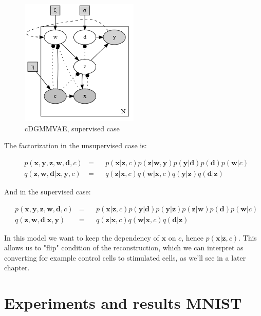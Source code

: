 \documentclass[11pt, a4paper]{report}
\theoremstyle{plain}
\theoremstyle{definition}
\theoremstyle{remark}
\newcommand{\x}{\mathbf{x}}
\newcommand{\z}{\mathbf{z}}
\newcommand{\y}{\mathbf{y}}
\newcommand{\w}{\mathbf{w}}
\newcommand{\dd}{\mathbf{d}}
\begin{document}
\begin{figure}[!hb]
\begin{framed}
\centering
\includegraphics[width=0.5\textwidth]{plots/dirichlet_gmm_cvae_supervised.gv.png}
\caption{cDGMMVAE, supervised case}
\label{fig:dirgmmcvae_super}
\end{framed}
\end{figure}

The factorization in the unsupervised case is:

\begin{equation}
\begin{aligned}
&p(\x, \y, \z, \w, \dd, c) &=& 
&p(\x | \z, c) p(\z | \w, \y) p(\y | \dd) p(\dd) p(\w | c) \\
&q(\z, \w, \dd | \x, \y, c) &=& 
&q(\z | \x, c) q(\w | \x, c) q(\y | \z) q(\dd | \z)
\label{eq:cgmmfact_unsupervised}
\end{aligned}
\end{equation}

And in the supervised case:

\begin{equation}
\begin{aligned}
&p(\x, \y, \z, \w, \dd, c) &=& 
&p(\x | \z, c) p(\y | \dd) p(\y | \z) p(\z | \w) p(\dd) p(\w | c) \\
&q(\z, \w, \dd | \x, \y) &=& 
&q(\z | \x, c) q(\w | \x, c) q(\dd | \z)
\label{eq:cgmmfact_supervised}
\end{aligned}
\end{equation}

In this model we want to keep the dependency of $\x$ on $c$, hence
$p(\x | \z, c)$. This allows us to "flip" condition of the reconstruction,
which we can interpret as converting for example control cells to stimulated
cells, as we'll see in a later chapter.


\chapter{Experiments and results MNIST}
\end{document}
